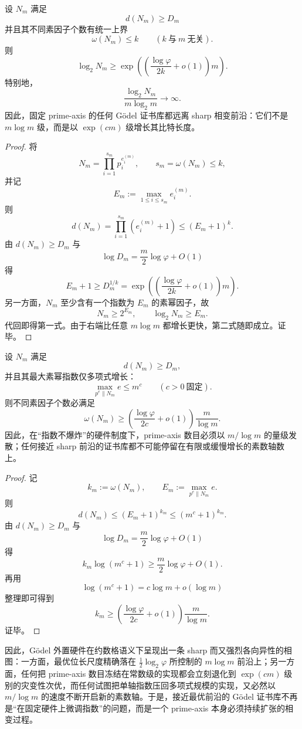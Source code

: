 \begin{corollary}\label{cor:conclusion-fixed-prime-axis-catastrophic-suboptimality}
设 \(N_m\) 满足
\[
d(N_m)\ge D_m
\]
并且其不同素因子个数有统一上界
\[
\omega(N_m)\le k
\qquad (k\ \text{与}\ m\ \text{无关}).
\]
则
\[
\log_2 N_m
\ge
\exp\!\left(\left(\frac{\log\varphi}{2k}+o(1)\right)m\right).
\]
特别地，
\[
\frac{\log_2 N_m}{m\log_2 m}\longrightarrow\infty.
\]
因此，固定 prime-axis 的任何 Gödel 证书库都远离 sharp 相变前沿：它们不是 \(m\log m\) 级，而是以 \(\exp(cm)\) 级增长其比特长度。
\end{corollary}
\begin{proof}
将
\[
N_m=\prod_{i=1}^{s_m}p_i^{e_i^{(m)}},
\qquad
s_m=\omega(N_m)\le k,
\]
并记
\[
E_m:=\max_{1\le i\le s_m}e_i^{(m)}.
\]
则
\[
d(N_m)=\prod_{i=1}^{s_m}(e_i^{(m)}+1)\le (E_m+1)^k.
\]
由 \(d(N_m)\ge D_m\) 与
\[
\log D_m=\frac{m}{2}\log\varphi+O(1)
\]
得
\[
E_m+1\ge D_m^{1/k}
=
\exp\!\left(\left(\frac{\log\varphi}{2k}+o(1)\right)m\right).
\]
另一方面，\(N_m\) 至少含有一个指数为 \(E_m\) 的素幂因子，故
\[
N_m\ge 2^{E_m},
\qquad
\log_2 N_m\ge E_m.
\]
代回即得第一式。由于右端比任意 \(m\log m\) 都增长更快，第二式随即成立。证毕。
\end{proof}

\begin{corollary}\label{cor:conclusion-polynomial-exponent-prime-axis-expansion}
设 \(N_m\) 满足
\[
d(N_m)\ge D_m,
\]
并且其最大素幂指数仅多项式增长：
\[
\max_{p^e\parallel N_m}e\le m^c
\qquad(c>0\ \text{固定}).
\]
则不同素因子个数必满足
\[
\omega(N_m)
\ge
\left(\frac{\log\varphi}{2c}+o(1)\right)\frac{m}{\log m}.
\]
因此，在“指数不爆炸”的硬件制度下，prime-axis 数目必须以 \(m/\log m\) 的量级发散；任何接近 sharp 前沿的证书库都不可能停留在有限或缓慢增长的素数轴数上。
\end{corollary}
\begin{proof}
记
\[
k_m:=\omega(N_m),
\qquad
E_m:=\max_{p^e\parallel N_m}e.
\]
则
\[
d(N_m)\le (E_m+1)^{k_m}\le (m^c+1)^{k_m}.
\]
由 \(d(N_m)\ge D_m\) 与
\[
\log D_m=\frac{m}{2}\log\varphi+O(1)
\]
得
\[
k_m\log(m^c+1)\ge \frac{m}{2}\log\varphi+O(1).
\]
再用
\[
\log(m^c+1)=c\log m+o(\log m)
\]
整理即可得到
\[
k_m
\ge
\left(\frac{\log\varphi}{2c}+o(1)\right)\frac{m}{\log m}.
\]
证毕。
\end{proof}

\noindent
因此，Gödel 外置硬件在约数格语义下呈现出一条 sharp 而又强烈各向异性的相图：一方面，最优位长尺度精确落在 \(\frac12\log_2\varphi\) 所控制的 \(m\log m\) 前沿上；另一方面，任何把 prime-axis 数目冻结在常数级的实现都会立刻退化到 \(\exp(cm)\) 级别的灾变性次优，而任何试图把单轴指数压回多项式规模的实现，又必然以 \(m/\log m\) 的速度不断开启新的素数轴。于是，接近最优前沿的 Gödel 证书库不再是“在固定硬件上微调指数”的问题，而是一个 prime-axis 本身必须持续扩张的相变过程。

\endinput
